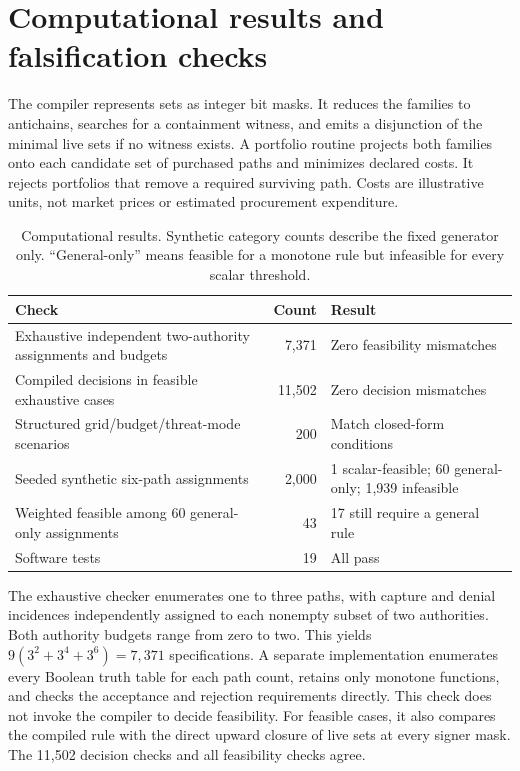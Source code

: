 \documentclass[11pt,letterpaper]{article}
\begin{document}
\section{Computational results and falsification checks}
The compiler represents sets as integer bit masks. It reduces the families to antichains, searches for a containment witness, and emits a disjunction of the minimal live sets if no witness exists. A portfolio routine projects both families onto each candidate set of purchased paths and minimizes declared costs. It rejects portfolios that remove a required surviving path. Costs are illustrative units, not market prices or estimated procurement expenditure.

\begin{table}[ht]
\centering\small
\begin{tabular}{p{.47\linewidth}r p{.29\linewidth}}
\toprule
Check & Count & Result \\
\midrule
Exhaustive independent two-authority assignments and budgets & 7,371 & Zero feasibility mismatches \\
Compiled decisions in feasible exhaustive cases & 11,502 & Zero decision mismatches \\
Structured grid/budget/threat-mode scenarios & 200 & Match closed-form conditions \\
Seeded synthetic six-path assignments & 2,000 & 1 scalar-feasible; 60 general-only; 1,939 infeasible \\
Weighted feasible among 60 general-only assignments & 43 & 17 still require a general rule \\
Software tests & 19 & All pass \\
\bottomrule
\end{tabular}
\caption{Computational results. Synthetic category counts describe the fixed generator only. ``General-only'' means feasible for a monotone rule but infeasible for every scalar threshold.}\label{tab:results}
\end{table}

The exhaustive checker enumerates one to three paths, with capture and denial incidences independently assigned to each nonempty subset of two authorities. Both authority budgets range from zero to two. This yields $9(3^2+3^4+3^6)=7,371$ specifications. A separate implementation enumerates every Boolean truth table for each path count, retains only monotone functions, and checks the acceptance and rejection requirements directly. This check does not invoke the compiler to decide feasibility. For feasible cases, it also compares the compiled rule with the direct upward closure of live sets at every signer mask. The 11,502 decision checks and all feasibility checks agree.
\end{document}
